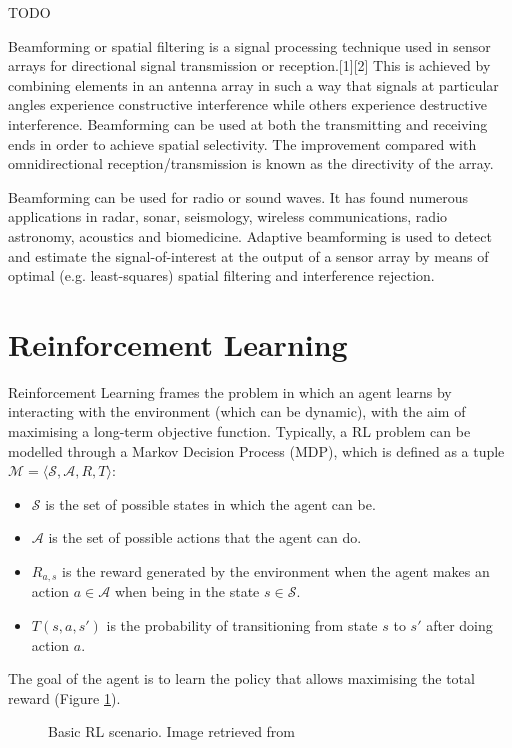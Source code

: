 \documentclass[12pt, a4paper,twoside]{tesi_upf}
\begin{document}
			TODO
		
			Beamforming or spatial filtering is a signal processing technique used in sensor arrays for directional signal transmission or reception.[1][2] This is achieved by combining elements in an antenna array in such a way that signals at particular angles experience constructive interference while others experience destructive interference. Beamforming can be used at both the transmitting and receiving ends in order to achieve spatial selectivity. The improvement compared with omnidirectional reception/transmission is known as the directivity of the array.
			
			Beamforming can be used for radio or sound waves. It has found numerous applications in radar, sonar, seismology, wireless communications, radio astronomy, acoustics and biomedicine. Adaptive beamforming is used to detect and estimate the signal-of-interest at the output of a sensor array by means of optimal (e.g. least-squares) spatial filtering and interference rejection.
	
		
		\section{Reinforcement Learning}
		\label{section:rl}				
			Reinforcement Learning frames the problem in which an agent learns by interacting with the environment (which can be dynamic), with the aim of maximising a long-term objective function. Typically, a RL problem can be modelled through a Markov Decision Process (MDP), which is defined as a tuple $\mathcal{M} = \langle \mathcal{S}, \mathcal{A}, R, T\rangle$:
			\begin{itemize}
				\item $\mathcal{S}$ is the set of possible states in which the agent can be.
				\item $\mathcal{A}$ is the set of possible actions that the agent can do.
				\item $R_{a,s}$ is the reward generated by the environment  when the agent makes an action $a \in \mathcal{A}$ when being in the state $s \in \mathcal{S}$.
				\item $T(s,a,s')$ is the probability of transitioning from state $s$ to $s'$ after doing action $a$.
			\end{itemize}
			The goal of the agent is to learn the policy that allows maximising the total reward (Figure \ref{fig:rl_scenario}). 
			\begin{figure}[h!]
				\centering
				\caption{Basic RL scenario. Image retrieved from \cite{sutton1998reinforcement}}
				\label{fig:rl_scenario}
			\end{figure}		
		
\end{document}
